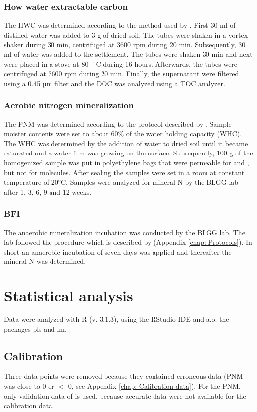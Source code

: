 \documentclass[10pt,twoside,dutch,english]{report}
\begin{document}
\subsubsection{How water extractable carbon}
The HWC was determined according to the method used by \citet{Ghani2003}. First 30 ml of distilled water was added to  3 g of dried soil. The tubes were shaken in a vortex shaker during 30 min, centrifuged at 3600 rpm during 20 min. Subsequently, 30 ml of water was added to the settlement. The tubes were shaken 30 min and next were placed in a stove at 80 ˚C during 16 hours. Afterwards, the tubes were centrifuged at 3600 rpm during 20 min. Finally, the supernatant were filtered using a 0.45 µm filter and the DOC was analyzed using a TOC analyzer. 

\subsubsection{Aerobic nitrogen mineralization}
The PNM was determined according to the protocol described by \citet{Ros2014}. Sample moister contents were set to about 60\% of the water holding capacity (WHC). The WHC was determined by the addition of water to dried soil until it became saturated and a water film was growing on the surface. Subsequently, 100 g of the homogenized sample was put in polyethylene bags that were permeable for  and  , but not for  molecules. After sealing the samples were set in a room at constant temperature of 20°C. Samples were analyzed for mineral N by the BLGG lab after 1, 3, 6, 9 and 12 weeks. 

\subsubsection{BFI}
The anaerobic mineralization incubation was conducted by the BLGG lab. The lab followed the procedure which is described by \citet{Hanegraaf2008} (Appendix \ref{chap: Protocols}). In short an anaerobic incubation of seven days was applied and thereafter the mineral N was determined. 



\section{Statistical analysis}
Data were analyzed with R (v. 3.1.3), using the RStudio IDE and a.o. the packages pls and lm. 
\subsection{Calibration}
Three data points were removed because they contained erroneous data (PNM was close to 0 or $<$ 0, see Appendix \ref{chap: Calibration data}). For the PNM, only validation data of  is used, because accurate  data were not available for the calibration data. 
\end{document}
